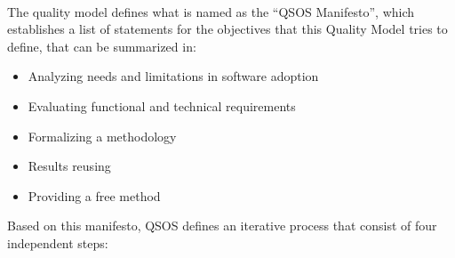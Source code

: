 \documentclass[11pt]{article}
\begin{document}
\begin{itemize}
\begin{itemize}
\\
The quality model defines what is named as the ``QSOS Manifesto'', which establishes a list of statements for the objectives that this Quality Model tries to define, that can be summarized in:
\begin{itemize}\itemsep0pt
\item{Analyzing needs and limitations in software adoption}
\item{Evaluating functional and technical requirements}
\item{Formalizing a methodology}
\item{Results reusing}
\item{Providing a free method}
\end{itemize}
Based on this manifesto, QSOS defines an iterative process that consist of four independent steps:


\end{itemize}
\end{itemize}
\end{document}
